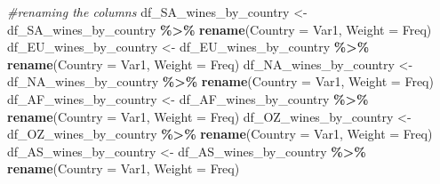\documentclass[
]{article}
\newenvironment{Shaded}{\begin{snugshade}}{\end{snugshade}}
\newcommand{\AttributeTok}[1]{\textcolor[rgb]{0.13,0.29,0.53}{#1}}
\newcommand{\CommentTok}[1]{\textcolor[rgb]{0.56,0.35,0.01}{\textit{#1}}}
\newcommand{\FunctionTok}[1]{\textcolor[rgb]{0.13,0.29,0.53}{\textbf{#1}}}
\newcommand{\NormalTok}[1]{#1}
\newcommand{\OtherTok}[1]{\textcolor[rgb]{0.56,0.35,0.01}{#1}}
\newcommand{\SpecialCharTok}[1]{\textcolor[rgb]{0.81,0.36,0.00}{\textbf{#1}}}
\begin{document}
\begin{Shaded}
\begin{Highlighting}[]
\CommentTok{\#renaming the columns}
\NormalTok{df\_SA\_wines\_by\_country }\OtherTok{\textless{}{-}}\NormalTok{ df\_SA\_wines\_by\_country }\SpecialCharTok{\%\textgreater{}\%} \FunctionTok{rename}\NormalTok{(}\AttributeTok{Country =}\NormalTok{ Var1, }\AttributeTok{Weight =}\NormalTok{ Freq)}
\NormalTok{df\_EU\_wines\_by\_country }\OtherTok{\textless{}{-}}\NormalTok{ df\_EU\_wines\_by\_country }\SpecialCharTok{\%\textgreater{}\%} \FunctionTok{rename}\NormalTok{(}\AttributeTok{Country =}\NormalTok{ Var1, }\AttributeTok{Weight =}\NormalTok{ Freq)}
\NormalTok{df\_NA\_wines\_by\_country }\OtherTok{\textless{}{-}}\NormalTok{ df\_NA\_wines\_by\_country }\SpecialCharTok{\%\textgreater{}\%} \FunctionTok{rename}\NormalTok{(}\AttributeTok{Country =}\NormalTok{ Var1, }\AttributeTok{Weight =}\NormalTok{ Freq)}
\NormalTok{df\_AF\_wines\_by\_country }\OtherTok{\textless{}{-}}\NormalTok{ df\_AF\_wines\_by\_country }\SpecialCharTok{\%\textgreater{}\%} \FunctionTok{rename}\NormalTok{(}\AttributeTok{Country =}\NormalTok{ Var1, }\AttributeTok{Weight =}\NormalTok{ Freq)}
\NormalTok{df\_OZ\_wines\_by\_country }\OtherTok{\textless{}{-}}\NormalTok{ df\_OZ\_wines\_by\_country }\SpecialCharTok{\%\textgreater{}\%} \FunctionTok{rename}\NormalTok{(}\AttributeTok{Country =}\NormalTok{ Var1, }\AttributeTok{Weight =}\NormalTok{ Freq)}
\NormalTok{df\_AS\_wines\_by\_country }\OtherTok{\textless{}{-}}\NormalTok{ df\_AS\_wines\_by\_country }\SpecialCharTok{\%\textgreater{}\%} \FunctionTok{rename}\NormalTok{(}\AttributeTok{Country =}\NormalTok{ Var1, }\AttributeTok{Weight =}\NormalTok{ Freq)}
\end{Highlighting}
\end{Shaded}
\end{document}
